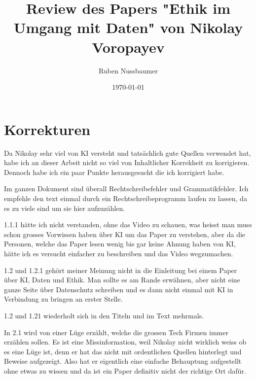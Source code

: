 \documentclass{article}
\title{Review des Papers "Ethik im Umgang mit Daten" von Nikolay Voropayev}
\author{Ruben Nussbaumer}
\date{\today}
\begin{document}
\maketitle


\newpage

\section{Korrekturen}

Da Nikolay sehr viel von KI versteht und tatsächlich gute Quellen verwendet hat, habe ich an dieser Arbeit nicht so viel von Inhaltlicher Korrekheit zu korrigieren. Dennoch habe ich ein paar Punkte herausgesucht die ich korrigiert habe.

Im ganzen Dokument sind überall Rechtschreibefehler und Grammatikfehler. 
Ich empfehle den text einmal durch ein Rechtschreibeprogramm laufen zu lassen, da es zu viele sind um sie hier aufzuzählen.

1.1.1 hätte ich nicht verstanden, ohne das Video zu schauen, was heisst man muss schon grosses Vorwissen haben über KI um das Paper zu verstehen, aber da die Personen, welche das Paper lesen wenig bis gar keine Ahnung haben von KI, hätte ich es versucht einfacher zu beschreiben und das Video wegzumachen.

1.2 und 1.2.1 gehört meiner Meinung nicht in die Einleitung bei einem Paper über KI, Daten und Ethik. Man sollte es am Rande erwähnen, aber nicht eine ganze Seite über Datenschutz schreiben und es dann nicht einmal mit KI in Verbindung zu bringen an erster Stelle.

1.2 und 1.21 wiederholt sich in den Titeln und im Text mehrmals.

In 2.1 wird von einer Lüge erzählt, welche die grossen Tech Firmen immer erzählen sollen. Es ist eine Missinformation, weil Nikolay nicht wirklich weiss ob es eine Lüge ist, denn er hat das nicht mit ordentlichen Quellen hinterlegt und Beweise aufgezeigt. Also hat er eigentlich eine einfache Behauptung aufgestellt ohne etwas zu wissen und da ist ein Paper definitiv nicht der richtige Ort dafür.
\end{document}
